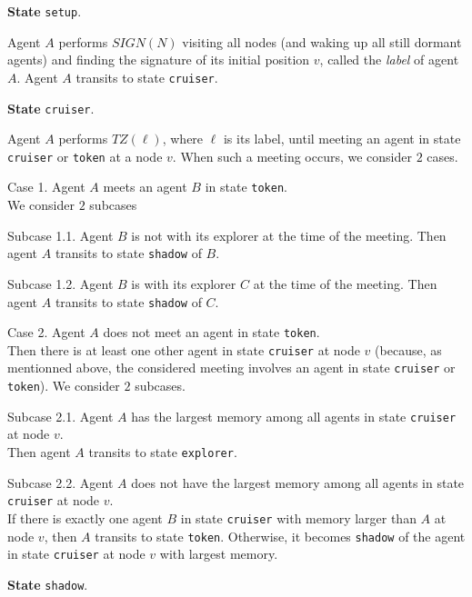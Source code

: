 \documentclass[11pt]{article}
\begin{document}
  \vspace*{0.2cm}
 
  \noindent
 {\bf State} {\tt setup}.
 
{Agent $A$ performs $SIGN(N)$ visiting all nodes (and waking up all still dormant agents) and finding the signature of its initial position $v$, called the {\em label} of agent $A$.}
 Agent $A$  transits to state  {\tt cruiser}.
 
  \vspace*{0.2cm}
 
  \noindent
 {\bf State} {\tt cruiser}.
 
 Agent $A$ performs $TZ(\ell)$, where $\ell$ is its label, until meeting an agent in state  {\tt cruiser} or {\tt token} at a node $v$. 
 {When such a meeting occurs, we consider $2$ cases.}

  \noindent
 Case 1.
 Agent $A$  meets an agent $B$ in state {\tt token}.\\
{We consider $2$ subcases}

{Subcase 1.1.}
{Agent $B$ is not with its explorer at the time of the meeting. Then agent $A$ transits to state {\tt shadow} of $B$.}

{Subcase 1.2.}
 {Agent $B$ is with its explorer $C$ at the time of the meeting. Then agent $A$ transits to state {\tt shadow} of $C$.}
 
 
  \noindent
 Case 2.
 Agent $A$ does not meet an agent  in state {\tt token}.\\ 
 Then there is at least one other agent in state {\tt cruiser} at node $v$ {(because, as mentionned above, the considered meeting involves an agent in state {\tt cruiser} or {\tt token})}. {We consider $2$ subcases.}
 
 Subcase 2.1.
 Agent $A$  has the largest memory among all agents in state  {\tt cruiser} at node $v$.\\
 Then agent $A$  transits to state {\tt explorer}.
 
 Subcase 2.2.
 Agent $A$  does not have the largest memory among all agents in state  {\tt cruiser} at node $v$.\\
 If there is exactly one agent $B$ in state {\tt cruiser}  with memory larger than $A$ at node $v$, then $A$ transits to state {\tt token}.
 Otherwise, it becomes {\tt shadow} of the agent in state  {\tt cruiser} at node $v$ with largest memory.
 
  \vspace*{0.2cm}
 
 \noindent
 {\bf State}  {\tt shadow}.
 
\end{document}
